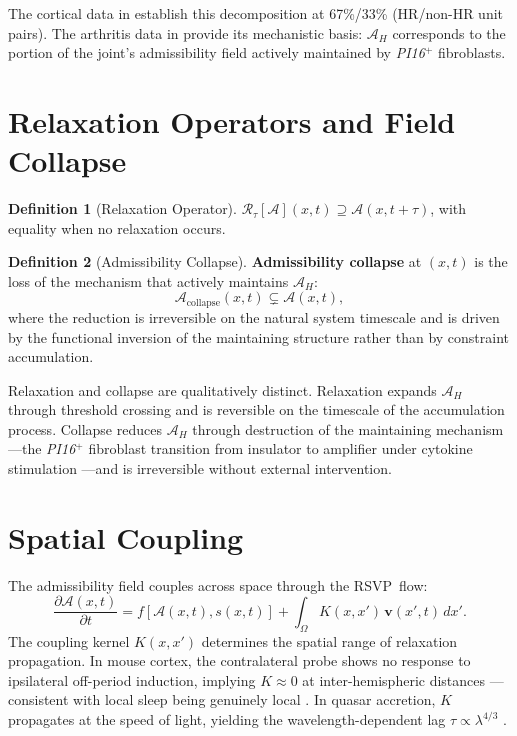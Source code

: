 \documentclass[12pt, a4paper, twoside]{book}
\theoremstyle{definition}
\newtheorem{definition}{Definition}[chapter]
\theoremstyle{remark}
\newcommand{\Adm}{\mathcal{A}}
\newcommand{\vv}{\mathbf{v}}
\newcommand{\Relax}{\mathcal{R}}
\newcommand{\term}[1]{\textbf{#1}}
\newcommand{\RSVP}{\textsf{RSVP}}
\newcommand{\gene}[1]{\textit{#1}}
\begin{document}
The cortical data in \citet{driessen2026} establish this decomposition at 67\%/33\% (HR/non-HR unit pairs). The arthritis data in \citet{davidson2026} provide its mechanistic basis: $\Adm_H$ corresponds to the portion of the joint's admissibility field actively maintained by \gene{PI16}$^+$ fibroblasts.

\section{Relaxation Operators and Field Collapse}

\begin{definition}[Relaxation Operator]
$\Relax_\tau[\Adm](x,t) \supseteq \Adm(x,t+\tau)$, with equality when no relaxation occurs.
\end{definition}

\begin{definition}[Admissibility Collapse]
\label{def:collapse}
\term{Admissibility collapse} at $(x,t)$ is the loss of the mechanism that actively maintains $\Adm_H$:
\begin{equation}
  \Adm_{\mathrm{collapse}}(x,t) \subsetneq \Adm(x,t),
\end{equation}
where the reduction is irreversible on the natural system timescale and is driven by the functional inversion of the maintaining structure rather than by constraint accumulation.
\end{definition}

Relaxation and collapse are qualitatively distinct. Relaxation expands $\Adm_H$ through threshold crossing and is reversible on the timescale of the accumulation process. Collapse reduces $\Adm_H$ through destruction of the maintaining mechanism---the \gene{PI16}$^+$ fibroblast transition from insulator to amplifier under cytokine stimulation \citep{davidson2026}---and is irreversible without external intervention.

\section{Spatial Coupling}

The admissibility field couples across space through the \RSVP\ flow:
\begin{equation}
  \frac{\partial \Adm(x,t)}{\partial t} = f[\Adm(x,t), s(x,t)] + \int_\Omega K(x,x')\,\vv(x',t)\,dx'.
\end{equation}
The coupling kernel $K(x,x')$ determines the spatial range of relaxation propagation. In mouse cortex, the contralateral probe shows no response to ipsilateral off-period induction, implying $K \approx 0$ at inter-hemispheric distances \citep{driessen2026}---consistent with local sleep being genuinely local \citep{vyazovskiy2011, huber2004}. In quasar accretion, $K$ propagates at the speed of light, yielding the wavelength-dependent lag $\tau \propto \lambda^{4/3}$ \citep{leung2026, cackett2020, fausnaugh2016}.
\end{document}
